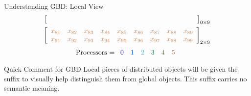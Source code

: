 \begin{frame}[shrink]
\begin{exampleblock}{Understanding GBD:  Local View}
\begin{align*}
\left[\begin{array}{lllllllll}
    &&&&&&&&\hspace{4.55cm} 
\end{array}\right]_{0\times 9}
\\
\left[\begin{array}{lllllllll}
      \color{g23}x_{81} & \color{g23}x_{82} & \color{g23}x_{83} & \color{g23}x_{84} & 
\color{g23}x_{85} & \color{g23}x_{86} & \color{g23}x_{87} & \color{g23}x_{88} & \color{g23}x_{89}\\
      \color{g23}x_{91} & \color{g23}x_{92} & \color{g23}x_{93} & \color{g23}x_{94} & 
\color{g23}x_{95} & \color{g23}x_{96} & \color{g23}x_{97} & \color{g23}x_{98} & \color{g23}x_{99}\\
\end{array}\right]_{2\times 9}
\end{align*}
\begin{align*}
\text{Processors = }
      \begin{array}{llllll}
      \color{g11}0 & \color{g12}1 & \color{g13}2 & \color{g21}3 & \color{g22}4 & \color{g23}5
      \end{array}
\end{align*}
\end{exampleblock}
\end{frame}



\begin{frame}[fragile]
  \begin{block}{Quick Comment for GBD}\pause
    Local pieces of  distributed objects will be given the suffix  to visually 
help distinguish them from global objects.  This suffix carries no semantic meaning.
  \end{block}
\end{frame}


